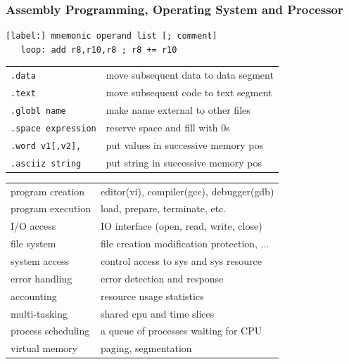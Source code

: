 \documentclass[10pt]{article}
\newcommand{\code}[1]{\texttt{#1}}
\begin{document}
\begin{multicols*}{2}
    \subsubsection*{Assembly Programming, Operating System and Processor}
    \begin{tcolorbox}[title=Assembly Language and Directives]
        \begin{verbatim}
[label:] mnemonic operand list [; comment]
   loop: add r8,r10,r8 ; r8 += r10
        \end{verbatim}
        \begin{tabular}{ll}
            \code{.data}             & move subsequent data to data segment \\
            \code{.text}             & move subsequent code to text segment \\
            \code{.globl name}       & make name external to other files    \\
            \code{.space expression} & reserve space and fill with 0s       \\
            \code{.word v1[,v2],}    & put values in successive memory pos  \\
            \code{.asciiz string}    & put string in successive memory pos  \\
        \end{tabular}
    \end{tcolorbox}

    \begin{tcolorbox}[title=OS Services]
        \begin{tabular}{ll}
            program creation   & editor(vi), compiler(gcc), debugger(gdb)   \\
            program execution  & load, prepare, terminate, etc.             \\
            I/O access         & IO interface (open, read, write, close)    \\
            file system        & file creation modification protection, ... \\
            system access      & control access to sys and sys resource     \\
            error handling     & error detection and response               \\
            accounting         & resource usage statistics                  \\
            multi-tasking      & shared cpu and time slices                 \\
            process scheduling & a queue of processes waiting for CPU       \\
            virtual memory     & paging, segmentation                       \\
        \end{tabular}
    \end{tcolorbox}


\end{multicols*}
\end{document}
